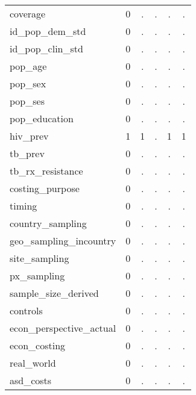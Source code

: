 \begin{table}[htbp]
\begin{tabular}{l*{1}{ccccc}}
coverage    &           0&           .&           .&           .&           .\\
id\_pop\_dem\_std&           0&           .&           .&           .&           .\\
id\_pop\_clin\_std&           0&           .&           .&           .&           .\\
pop\_age     &           0&           .&           .&           .&           .\\
pop\_sex     &           0&           .&           .&           .&           .\\
pop\_ses     &           0&           .&           .&           .&           .\\
pop\_education&           0&           .&           .&           .&           .\\
hiv\_prev    &           1&           1&           .&           1&           1\\
tb\_prev     &           0&           .&           .&           .&           .\\
tb\_rx\_resistance&           0&           .&           .&           .&           .\\
costing\_purpose&           0&           .&           .&           .&           .\\
timing      &           0&           .&           .&           .&           .\\
country\_sampling&           0&           .&           .&           .&           .\\
geo\_sampling\_incountry&           0&           .&           .&           .&           .\\
site\_sampling&           0&           .&           .&           .&           .\\
px\_sampling &           0&           .&           .&           .&           .\\
sample\_size\_derived&           0&           .&           .&           .&           .\\
controls    &           0&           .&           .&           .&           .\\
econ\_perspective\_actual&           0&           .&           .&           .&           .\\
econ\_costing&           0&           .&           .&           .&           .\\
real\_world  &           0&           .&           .&           .&           .\\
asd\_costs   &           0&           .&           .&           .&           .\\

\end{tabular}
\end{table}
